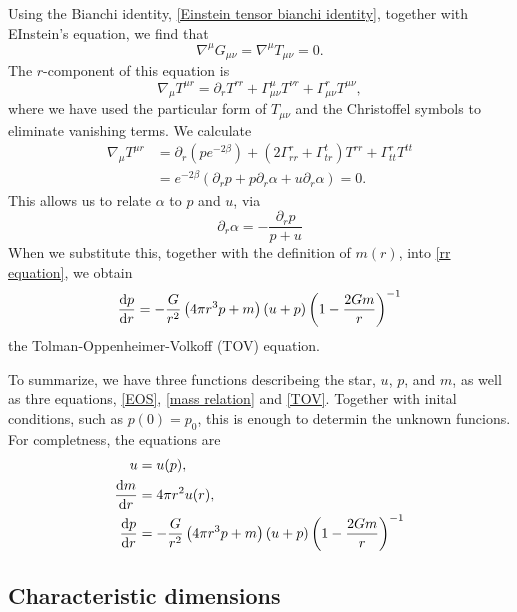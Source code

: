 Using the Bianchi identity, \autoref{Einstein tensor bianchi identity}, together with EInstein's equation, we find that
%
\begin{equation}
    \nabla^\mu G_{\mu \nu} = \nabla^\mu T_{\mu \nu} = 0.
\end{equation}
%
The $r$-component of this equation is
%
\begin{equation}
    \nabla_\mu T^{\mu r} 
    =
    \partial_r T^{rr} 
    + \Gamma^\mu_{\mu \nu} T^{\nu r} 
    + \Gamma^r_{\mu \nu} T^{\mu \nu},
\end{equation}
%
where we have used the particular form of $T_{\mu \nu}$ and the Christoffel symbols to eliminate vanishing terms.
We calculate
%
\begin{align*}
    \nabla_\mu T^{\mu r} 
    & = 
    \partial_r \left(p e^{-2\beta}\right)
    + (2 \Gamma^r_{rr} + \Gamma^t_{tr}) T^{rr} 
    + \Gamma^r_{tt}T^{tt} \\ 
    &=   e^{-2\beta} \left( \partial_r p + p \partial_r \alpha + u \partial_r \alpha \right) = 0.
\end{align*} 
%
This allows us to relate $\alpha$ to $p$ and $u$, via
\begin{equation}
    \partial_r \alpha = - \frac{\partial_r p}{p + u}
\end{equation}
When we substitute this, together with the definition of $m(r)$, into \autoref{rr equation}, we obtain
\begin{equation}
    \label{TOV}
    \diff{p}{r}
    =
    -
    \frac{G}{r^2} 
    \left(4 \pi r^{3} p + m \right) 
    \left(u + p \right)
    \left(1 - \frac{2 G m}{r}\right)^{-1}
\end{equation}
the Tolman-Oppenheimer-Volkoff (TOV) equation.

To summarize, we have three functions describeing the star, $u$, $p$, and $m$, as well as thre equations, \autoref{EOS}, \autoref{mass relation} and \autoref{TOV}.
Together with inital conditions, such as $p(0) = p_0$, this is enough to determin the unknown funcions.
For completness, the equations are
\begin{align*} 
    u & = u(p) , \\
    \diff{m}{r} & = 4 \pi r^2 u(r), \\
    \diff{p}{r} & =
    -
    \frac{G}{r^2} 
    \left(4 \pi r^{3} p + m \right) 
    \left(u + p \right) 
    \left(1 - \frac{2 G m}{r }\right)^{-1}
\end{align*}

\subsection*{Characteristic dimensions}

